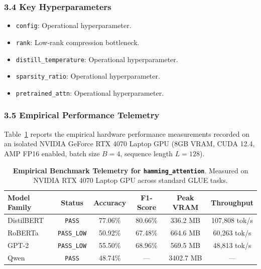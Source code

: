 \subsubsection*{3.4 Key Hyperparameters}
\begin{itemize}
    \item \texttt{config}: Operational hyperparameter.
    \item \texttt{rank}: Low-rank compression bottleneck.
    \item \texttt{distill\_temperature}: Operational hyperparameter.
    \item \texttt{sparsity\_ratio}: Operational hyperparameter.
    \item \texttt{pretrained\_attn}: Operational hyperparameter.
\end{itemize}

\subsubsection*{3.5 Empirical Performance Telemetry}
Table~\ref{tab:telemetry_hamming_attention} reports the empirical hardware performance measurements recorded on an isolated NVIDIA GeForce RTX 4070 Laptop GPU (8GB VRAM, CUDA 12.4, AMP FP16 enabled, batch size $B=4$, sequence length $L=128$).

\begin{table}[h]
\centering
\small
\caption{\textbf{Empirical Benchmark Telemetry for \texttt{hamming\_attention}}. Measured on NVIDIA RTX 4070 Laptop GPU across standard GLUE tasks.}
\label{tab:telemetry_hamming_attention}
\begin{tabular*}{\columnwidth}{@{\extracolsep{\fill}}lccccc}
\toprule
\textbf{Model Family} & \textbf{Status} & \textbf{Accuracy} & \textbf{F1-Score} & \textbf{Peak VRAM} & \textbf{Throughput} \\
\midrule
DistilBERT & \texttt{PASS} & 77.06\% & 80.66\% & 336.2 MB & 107,808 tok/s \\
RoBERTa & \texttt{PASS\_LOW} & 50.92\% & 67.48\% & 664.6 MB & 60,263 tok/s \\
GPT-2 & \texttt{PASS\_LOW} & 55.50\% & 68.96\% & 569.5 MB & 48,813 tok/s \\
Qwen & \texttt{PASS} & 48.74\% & --- & 3402.7 MB & --- \\
\bottomrule
\end{tabular*}
\end{table}

